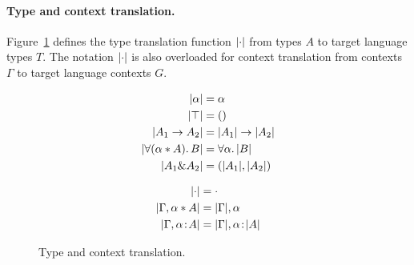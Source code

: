 \paragraph{Type and context translation.}
Figure~\ref{fig:type-and-context-translation} defines the type translation
function $\lvert \cdot \rvert$ from \name types $A$ to target language types $T$. 
The notation $\lvert \cdot \rvert$ is also overloaded for context translation from \name
contexts $\Gamma$ to target language contexts $G$.

\begin{figure}[!t]
\begin{minipage}[t]{.5\textwidth}

  \begin{align*}
    \lvert \alpha \rvert                &= \alpha \\
    \lvert \top \rvert                  &= () \\
    \lvert A_1 \to A_2 \rvert         &= \lvert A_1 \rvert \to \lvert A_2 \rvert \\
    \lvert \forall (\alpha * A).\, B \rvert  &= \forall \alpha.\, \lvert B \rvert \\
    \lvert A_1 \& A_2 \rvert      &= (\lvert A_1 \rvert, \lvert A_2 \rvert) \\
  \end{align*}
\end{minipage}
\begin{minipage}[t]{.5\textwidth}

  \begin{align*}
    \lvert \cdot \rvert                        &= \cdot \\
    \lvert \Gamma, \alpha * A \rvert &= \lvert \Gamma \rvert, \alpha \\
    \lvert \Gamma, \alpha \!:\! A \rvert   &= \lvert \Gamma \rvert, \alpha \!:\! \lvert A \rvert
  \end{align*}
\end{minipage}
  \caption{Type and context translation.}
  \label{fig:type-and-context-translation}
\end{figure}


